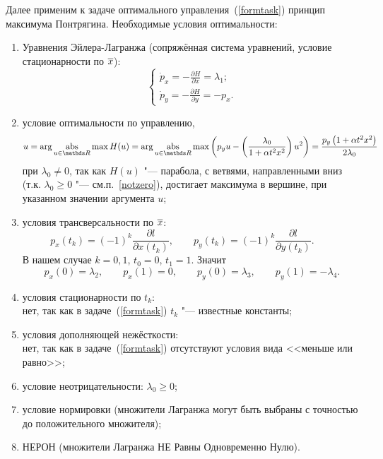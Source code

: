 Далее применим к задаче оптимального управления~(\ref{formtask}) принцип максимума Понтрягина. Необходимые условия оптимальности:
\begin{enumerate}
\item Уравнения Эйлера-Лагранжа (сопряжённая система уравнений, условие стационарности по $\overline{x}$):
\begin{equation}\label{Euler}
\begin{cases}
\dot {p}_x = - \frac{\partial H}{\partial x} = \lambda_1;\\
\dot {p}_y =  - \frac{\partial H}{\partial y} = -p_x.
\end{cases}
\end{equation}
\item\label{optimal}
условие оптимальности по управлению,
\[
u = \mathrm{arg} \mathop{\rm abs}\limits_{u \in \R} \max H(u) = \mathrm{arg} \mathop{\rm abs}\limits_{u \in \R} \max \left(p_y u - \left(\frac{\lambda_0}{1+\alpha t^2x^2}\right)  u^2\right) = \frac{p_y \left(1+\alpha t^2x^2\right)}{2\lambda_0}
\]
при $\lambda_0 \not= 0$, так как $H(u)$ "--- парабола, с ветвями, направленными вниз (т.к. $\lambda_0 \ge 0$
"--- см.п.~\ref{notzero}), достигает максимума в вершине, при указанном значении аргумента $u$;
\item\label{trans}
условия трансверсальности по $\overline{x}$:
\[
p_x(t_k) = (-1)^k \frac{\partial l}{\partial x(t_k)}, \qquad
p_y(t_k) = (-1)^k \frac{\partial l}{\partial y(t_k)}. \qquad
\]
В нашем случае $k = 0, 1$, $t_0 = 0$, $t_1 = 1$. Значит
\[
p_x(0) = \lambda_2,
\qquad
p_x(1) = 0,
\qquad
p_y(0) = \lambda_3,
\qquad
p_y(1) = - \lambda_4. 
\] 
\item условия стационарности по $t_k$:\\ нет, так как в задаче~(\ref{formtask}) $t_k$ "--- известные константы;
\item условия дополняющей нежёсткости:\\ нет, так как в задаче~(\ref{formtask}) отсутствуют условия вида <<меньше или равно>>;
\item\label{notzero}
условие неотрицательности: $\lambda_0 \ge 0$;
\item условие нормировки (множители Лагранжа могут быть выбраны с точностью до положительного множителя);
\item\label{NERON}
НЕРОН (множители Лагранжа НЕ Равны Одновременно Нулю).
\end{enumerate}
